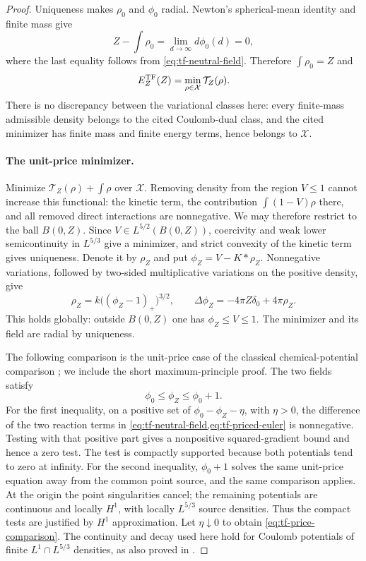\begin{proof}
Uniqueness makes $\rho_0$ and $\phi_0$ radial.  Newton's spherical-mean
identity and finite mass give
\[
 Z-\int\rho_0=\lim_{d\to\infty}d\phi_0(d)=0,
\]
where the last equality follows from \cref{eq:tf-neutral-field}.
Therefore $\int\rho_0=Z$ and
\begin{equation}\label{eq:tf-neutral-minimum}
 E_Z^{\mathrm{TF}}(Z)=\min_{\rho\in\mathcal X}\mathcal T_Z(\rho).
\end{equation}
There is no discrepancy between the variational classes here: every
finite-mass admissible density belongs to the cited Coulomb-dual class,
and the cited minimizer has finite mass and finite energy terms, hence
belongs to $\mathcal X$.

\paragraph{The unit-price minimizer.}
Minimize $\mathcal T_Z(\rho)+\int\rho$ over $\mathcal X$.
Removing density from the region $V\le1$ cannot increase this functional:
the kinetic term, the contribution $\int(1-V)\rho$ there, and all removed
direct interactions are nonnegative.  We may therefore restrict to the
ball $B(0,Z)$.  Since $V\in L^{5/2}(B(0,Z))$, coercivity and weak lower
semicontinuity in $L^{5/3}$ give a minimizer, and strict convexity of the
kinetic term gives uniqueness.  Denote it by $\rho_Z$ and put
$\phi_Z=V-K*\rho_Z$.  Nonnegative variations, followed by two-sided
multiplicative variations on the positive density, give
\begin{equation}\label{eq:tf-priced-euler}
 \rho_Z=k\bigl((\phi_Z-1)_+\bigr)^{3/2},\qquad
 \Delta\phi_Z=-4\pi Z\delta_0+4\pi\rho_Z.
\end{equation}
This holds globally: outside $B(0,Z)$ one has $\phi_Z\le V\le1$.
The minimizer and its field are radial by uniqueness.

The following comparison is the unit-price case of the classical
chemical-potential comparison \cite[Lemma~5.1]{Solovej2003}; we include
the short maximum-principle proof. The two fields satisfy
\begin{equation}\label{eq:tf-price-comparison}
 \phi_0\le\phi_Z\le\phi_0+1.
\end{equation}
For the first inequality, on a positive set of
$\phi_0-\phi_Z-\eta$, with $\eta>0$, the difference of the two reaction
terms in \cref{eq:tf-neutral-field,eq:tf-priced-euler} is nonnegative.
Testing with that positive part gives a nonpositive squared-gradient
bound and hence a zero test.  The test is compactly supported because
both potentials tend to zero at infinity.  For the second inequality,
$\phi_0+1$ solves the same unit-price equation away from the common
point source, and the same comparison applies.  At the origin the point
singularities cancel; the remaining potentials are continuous and locally
$H^1$, with locally $L^{5/3}$ source densities.  Thus the compact tests
are justified by $H^1$ approximation.  Let $\eta\downarrow0$ to obtain
\cref{eq:tf-price-comparison}.  The continuity and decay used here hold for
Coulomb potentials of finite $L^1\cap L^{5/3}$ densities, as also proved
in \cite[\FTFExistence]{Foundation}.


\end{proof}
